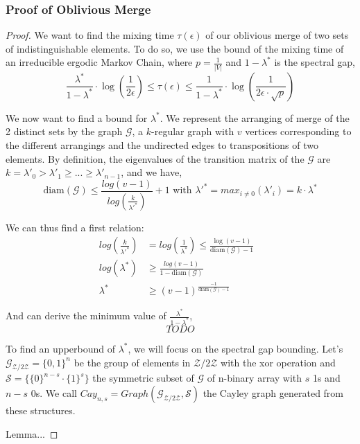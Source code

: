 \documentclass[conference]{IEEEtran}
\begin{document}
\subsubsection{Proof of Oblivious Merge}
\label{proofOM}
\begin{proof}
We want to find the mixing time $\tau(\epsilon)$ of our oblivious merge of two sets of indistinguishable elements. To do so, we use the bound of the mixing time of an irreducible ergodic Markov Chain, where $p = \frac{1}{|V|}$ and $1-\lambda^*$ is the spectral gap,
$$\frac{\lambda^*}{1-\lambda^*} \cdot \log\left(\frac{1}{2 \epsilon} \right)\leq \tau(\epsilon) \leq \frac{1}{1-\lambda^*}\cdot \log \left( \frac{1}{2 \epsilon \cdot \sqrt{p}}\right) $$

We now want to find a bound for $\lambda^*$. We represent the arranging of merge of the 2 distinct sets by the graph $\mathcal{G}$, a $k$-regular graph with $v$ vertices corresponding to the different arrangings and the undirected edges to transpositions of two elements.
By definition, the eigenvalues of the transition matrix of the $\mathcal{G}$ are $k={\lambda'}_0 > {\lambda'}_1 \geq  ... \geq {\lambda'}_{n-1}$, and we have,
$$\text{diam}\left( \mathcal{G}\right) \leq \frac{log(v-1)}{log(\frac{k}{{\lambda'}^*})}+1 \text{ with } {\lambda'}^* = max_{i\neq0}({\lambda'}_i)= k \cdot \lambda^*$$

We can thus find a first relation:
\begin{align*}
log(\frac{k}{{\lambda'}^*}) &= log(\frac{1}{{\lambda}^*}) \leq\frac{\log(v-1)}{\text{diam}\left(\mathcal{G}\right)-1}&\\
log({{\lambda}^*}) &\geq  \frac{log(v-1)}{1-\text{diam}\left(\mathcal{G}\right)}&\\
{\lambda}^* &\geq (v-1)^{\frac{-1}{\text{diam}\left(\mathcal{G}\right)-1}}
\end{align*}

And can derive the minimum value of $\frac{\lambda^*}{1-\lambda^*}$,
$$TODO$$

To find an upperbound of $\lambda^*$, we will focus on the spectral gap bounding.
Let's $\mathcal{G}_{\mathcal{Z}/2\mathcal{Z}}=\{0,1\}^n$ be the group of elements in $\mathcal{Z}/2\mathcal{Z}$ with the xor operation and $\mathcal{S}=\{\{0\}^{n-s}\cdot\{1\}^s\}$ the symmetric subset of $\mathcal{G}$ of n-binary array with $s$ 1s and $n-s$ 0s.
We call $Cay_{n,s}=Graph\left(  \mathcal{G}_{\mathcal{Z}/2\mathcal{Z}}, \mathcal{S} \right) $ the Cayley graph generated from these structures.

Lemma...


\end{proof}
\end{document}
